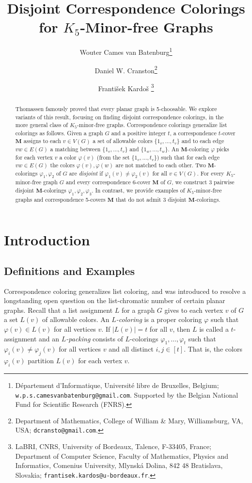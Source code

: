 \documentclass[11pt]{article}
\title{Disjoint Correspondence Colorings\\ for $K_5$-Minor-free Graphs}
\author{
	Wouter Cames van Batenburg\thanks{ D\'epartement d’Informatique, Universit\'e libre de Bruxelles, Belgium; \texttt{w.p.s.camesvanbatenburg@gmail.com}. Supported by the Belgian National Fund
for Scientific Research (FNRS).}
\and
	Daniel W. Cranston\thanks{Department of Mathematics, College of William \& Mary, Williamsburg, VA, USA;
	\texttt{dcransto@gmail.com}.}
\and 
	Franti\v{s}ek Kardo\v{s}
	\thanks{LaBRI, CNRS, University of Bordeaux, Talence, F-33405, France; Department of Computer Science, Faculty of Mathematics, Physics and Informatics, Comenius University, Mlynsk\'{a} Dolina, 842 48 Bratislava, Slovakia; \texttt{frantisek.kardos@u-bordeaux.fr}.}
}
\theoremstyle{definition}
\newcommand\vph{\varphi}
\newcommand\MM{\textbf{M}}
\begin{document}
\maketitle
\begin{abstract}
        Thomassen famously proved that every planar graph is 5-choosable.  We explore variants of this 
	result, focusing on finding disjoint correspondence colorings, in the more general class of 
	$K_5$-minor-free graphs.  Correspondence colorings generalize list colorings as follows.
	Given a graph $G$ and a positive integer $t$, a correspondence $t$-cover $\MM$ assigns 
	to each $v\in V(G)$ a set of allowable colors $\{1_v,\ldots,t_v\}$ and to each edge $vw\in E(G)$
	a matching between $\{1_v,\ldots,t_v\}$ and $\{1_w,\ldots,t_w\}$. An $\MM$-coloring $\vph$
	picks for each vertex $v$ a color $\vph(v)$ (from the set $\{1_v,\ldots,t_v\}$) such that for
	each edge $vw\in E(G)$ the colors $\vph(v),\vph(w)$ are not matched to each other.
	Two $\MM$-colorings $\vph_1,\vph_2$ of $G$ are \emph{disjoint} if $\vph_1(v)\ne\vph_2(v)$
	for all $v\in V(G)$.  For every $K_5$-minor-free graph $G$ and every correspondence 6-cover 
	$\MM$ of $G$, we construct 3 pairwise disjoint $\MM$-colorings $\vph_1,\vph_2,\vph_3$.
	In contrast, we provide examples of $K_5$-minor-free graphs and correspondence 5-covers $\MM$ 
	that do not admit 3 disjoint $\MM$-colorings.
\end{abstract}

\section{Introduction}
\subsection{Definitions and Examples}
Correspondence coloring generalizes list coloring, and was introduced to resolve a longstanding open 
question \cite{DP} on the list-chromatic number of certain planar graphs.  Recall that a list assignment 
$L$ for a graph $G$ gives to each vertex $v$ of $G$ a set $L(v)$ of allowable colors.  An \emph{$L$-coloring} 
is a proper coloring $\vph$ such that $\vph(v)\in L(v)$ for all vertices $v$.  If $|L(v)|=t$ for all $v$, 
then $L$ is called a $t$-assignment and an \emph{$L$-packing}
consists of $L$-colorings $\vph_1,\ldots,\vph_t$ such that $\vph_i(v)\ne \vph_j(v)$ for all vertices $v$
and all distinct $i,j\in[t]$.  That is, the colors $\vph_i(v)$ partition $L(v)$ for each vertex $v$.
\end{document}
